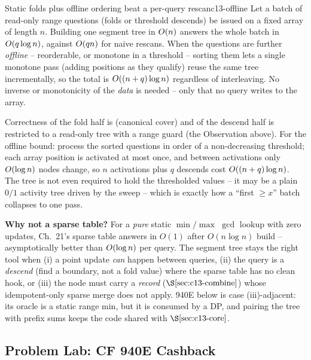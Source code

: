 \begin{proposition}{Static folds plus offline ordering beat a per-query rescan}{c13-offline}
Let a batch of read-only range questions (folds or threshold descends) be issued
on a fixed array of length \(n\).  Building one segment tree in \(O(n)\)
answers the whole batch in \(O(q\log n)\), against \(O(qn)\) for naive
rescans.  When the questions are further \emph{offline} -- reorderable, or
monotone in a threshold -- sorting them lets a single monotone pass (adding
positions as they qualify) reuse the same tree incrementally, so the total is
\(O((n+q)\log n)\) regardless of interleaving.  No inverse or monotonicity of
the \emph{data} is needed -- only that no query writes to the array.
\end{proposition}
\begin{proofbox}
Correctness of the fold half is  (canonical cover) and of the
descend half is  restricted to a read-only tree with a range
guard (the Observation above).  For the offline bound: process the
sorted questions in order of a non-decreasing threshold; each array position is
activated at most once, and between activations only \(O(\log n)\) nodes
change, so \(n\) activations plus \(q\) descends cost \(O((n+q)\log n)\).
The tree is not even required to hold the thresholded values -- it may be a
plain \(0/1\) activity tree driven by the sweep -- which is exactly how a
``first \(\ge x\)'' batch collapses to one pass.
\end{proofbox}

\noindent\textbf{Why not a sparse table?}  For a \emph{pure} static \(\min/\max\)
\(\gcd\) lookup with zero updates, Ch.~21's sparse table answers in \(O(1)\) after
\(O(n\log n)\) build -- asymptotically better than \(O(\log n)\) per query.
The segment tree stays the right tool when (i) a point update \emph{can} happen
between queries, (ii) the query is a \emph{descend} (find a boundary, not a fold
value) where the sparse table has no clean hook, or (iii) the node must carry a
\emph{record} (\(\secref{c13-combine}\)) whose idempotent-only sparse merge does
not apply.  940E below is case (iii)-adjacent: its oracle is a static range min,
but it is consumed by a DP, and pairing the tree with prefix sums keeps the code
shared with \(\secref{c13-core}\).

\subsection{Problem Lab: CF 940E Cashback}

